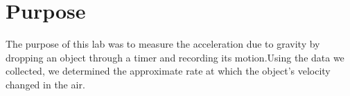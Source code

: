 
\section{Purpose}
\vspace{-0.5cm}
\singlespacing
The purpose of this lab was to measure the acceleration due to gravity by dropping an object through a timer and recording its motion.Using the data we collected, we determined the approximate rate at which the object's velocity changed in the air.

